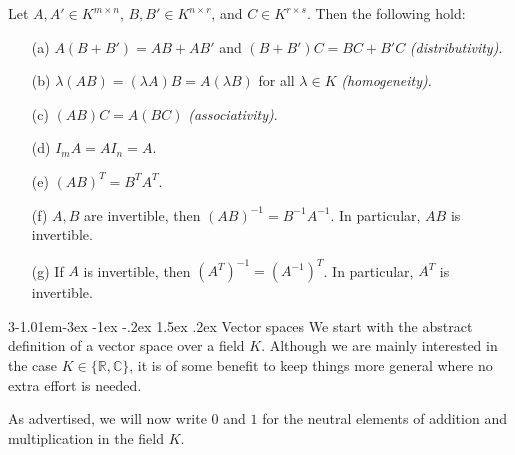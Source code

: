 \documentclass{tufte-handout}
\makeatletter
\renewcommand{\section}{\@startsection{section}%
    {3}{-1.01em}{-3ex \@plus -1ex \@minus -.2ex}%
    {1.5ex \@plus .2ex}
    {\hspace*{-5.5em}\fcolorbox{blue}{blue}{\parbox[c][1.0ex][b]{4em}{\phantom{space}}}
    \normalfont\Large\itshape\color{blue}}}
\makeatother
\begin{document}
\begin{Theorem}
Let $A, A' \in K^{m \times n}$, $B, B' \in K^{n \times r}$, and $C \in K^{r \times s}$. Then the following hold:
\begin{enumerate}
    \item[(a)] $A(B + B') = AB + AB'$ and $(B + B')C = BC + B'C$ \hfill \textit{(distributivity)}.
    \item[(b)] $\lambda(AB) = (\lambda A)B = A(\lambda B)$ for all $\lambda \in K$ \hfill \textit{(homogeneity)}.
    \item[(c)] $(AB)C = A(BC)$ \hfill \textit{(associativity)}.
    \item[(d)] $I_m A = AI_n = A$.
    \item[(e)] $(AB)^T = B^T A^T$.
    \item[(f)] $A, B$ are invertible, then $(AB)^{-1} = B^{-1}A^{-1}$. In particular, $AB$ is invertible.
    \item[(g)] If $A$ is invertible, then $(A^T)^{-1} = (A^{-1})^T$. In particular, $A^T$ is invertible.
\end{enumerate}
\end{Theorem}



\section{Vector spaces}
We start with the abstract definition of a vector space over a field $K$. Although we are mainly interested in the case $K \in \{\mathbb{R}, \mathbb{C}\}$, it is of some benefit to keep things more general where no extra effort is needed.

As advertised, we will now write $0$ and $1$ for the neutral elements of addition and multiplication in the field $K$.
\end{document}
